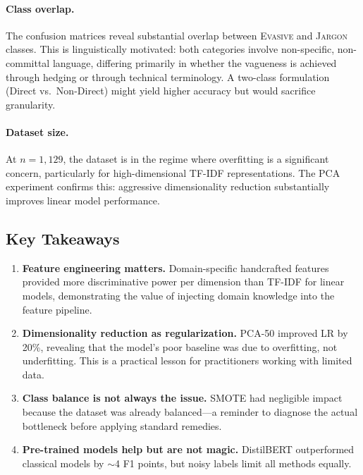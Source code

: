 \documentclass[12pt]{article}
\begin{document}
\paragraph{Class overlap.} The confusion matrices reveal substantial
overlap between \textsc{Evasive} and \textsc{Jargon} classes. This is
linguistically motivated: both categories involve non-specific,
non-committal language, differing primarily in whether the vagueness
is achieved through hedging or through technical terminology. A
two-class formulation (Direct vs.\ Non-Direct) might yield higher
accuracy but would sacrifice granularity.

\paragraph{Dataset size.} At $n = 1{,}129$, the dataset is in the
regime where overfitting is a significant concern, particularly for
high-dimensional TF-IDF representations. The PCA experiment confirms
this: aggressive dimensionality reduction substantially improves
linear model performance.

\subsection{Key Takeaways}

\begin{enumerate}[nosep]
    \item \textbf{Feature engineering matters.} Domain-specific handcrafted
          features provided more discriminative power per dimension than
          TF-IDF for linear models, demonstrating the value of injecting
          domain knowledge into the feature pipeline.
    \item \textbf{Dimensionality reduction as regularization.} PCA-50
          improved LR by 20\%, revealing that the model's poor baseline was
          due to overfitting, not underfitting. This is a practical lesson
          for practitioners working with limited data.
    \item \textbf{Class balance is not always the issue.} SMOTE had
          negligible impact because the dataset was already balanced---a
          reminder to diagnose the actual bottleneck before applying
          standard remedies.
    \item \textbf{Pre-trained models help but are not magic.} DistilBERT
          outperformed classical models by $\sim$4 F1 points, but noisy
          labels limit all methods equally.
\end{enumerate}
\end{document}
